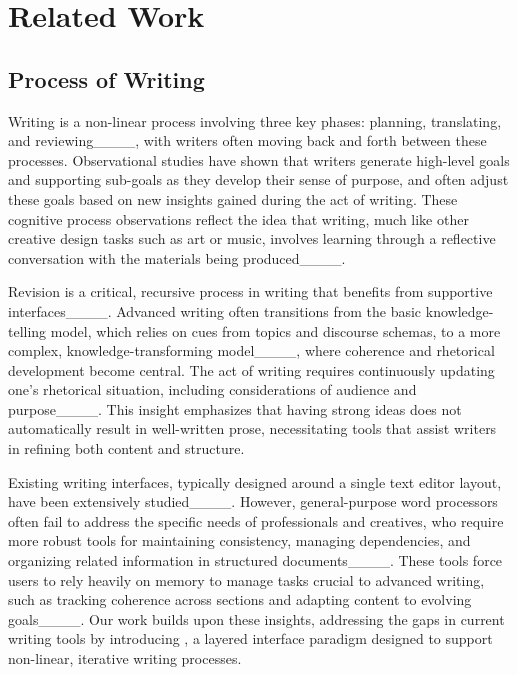 \section{Related Work}
\subsection{Process of Writing}
Writing is a non-linear process involving three key phases: planning, translating, and reviewing____, with writers often moving back and forth between these processes\change{____}. Observational studies have shown that writers generate high-level goals and supporting sub-goals as they develop their sense of purpose, and often adjust these goals based on new insights gained during the act of writing\change{____}. These cognitive process observations reflect the idea that writing, much like other creative design tasks such as art or music, involves learning through a reflective conversation with the materials being produced____.

Revision is a critical, recursive process in writing that benefits from supportive interfaces____. Advanced writing often transitions from the basic knowledge-telling model, which relies on cues from topics and discourse schemas, to a more complex, knowledge-transforming model____, where coherence and rhetorical development become central. The act of writing requires continuously updating one's rhetorical situation, including considerations of audience and purpose____. This insight emphasizes that having strong ideas does not automatically result in well-written prose\change{____}, necessitating tools that assist writers in refining both content and structure.

Existing writing interfaces, typically designed around a single text editor layout, have been extensively studied____. However, general-purpose word processors often fail to address the specific needs of professionals and creatives, who require more robust tools for maintaining consistency, managing dependencies, and organizing related information in structured documents____. These tools force users to rely heavily on memory to manage tasks crucial to advanced writing, such as tracking coherence across sections and adapting content to evolving goals____. Our work builds upon these insights, addressing the gaps in current writing tools by introducing \system, a layered interface paradigm designed to support non-linear, iterative writing processes. 



